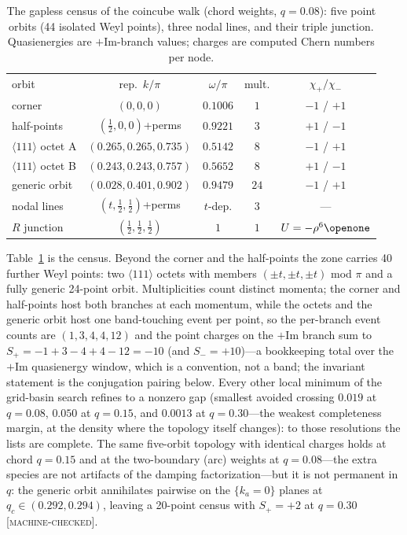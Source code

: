 \documentclass[aps,prd,twocolumn,superscriptaddress,nofootinbib,floatfix]{revtex4-2}
\newcommand{\evM}{\textnormal{\textsc{[machine-checked]}}}
\begin{document}
\begin{table}[!htb]
\caption{The gapless census of the coincube walk (chord weights,
$q=0.08$): five point orbits (44 isolated Weyl points), three nodal
lines, and their triple junction. Quasienergies are $+$Im-branch values;
charges are computed Chern numbers per node.}
\label{tab:census}
\begin{ruledtabular}
\footnotesize
\begin{tabular}{lcccc}
orbit & rep.\ $k/\pi$ & $\omega/\pi$ & mult. & $\chi_{+}/\chi_{-}$\\
\colrule
corner & $(0,0,0)$ & $0.1006$ & $1$ & $-1$ / $+1$\\
half-points & $(\tfrac12,0,0)$+perms & $0.9221$ & $3$ & $+1$ / $-1$\\
$\langle111\rangle$ octet A & $(0.265,0.265,0.735)$ & $0.5142$ & $8$ & $-1$ / $+1$\\
$\langle111\rangle$ octet B & $(0.243,0.243,0.757)$ & $0.5652$ & $8$ & $+1$ / $-1$\\
generic orbit & $(0.028,0.401,0.902)$ & $0.9479$ & $24$ & $-1$ / $+1$\\
nodal lines & $(t,\tfrac12,\tfrac12)$+perms & $t$-dep. & $3$ & ---\\
$R$ junction & $(\tfrac12,\tfrac12,\tfrac12)$ & $1$ & $1$ & $U=-\rho^6\openone$
\end{tabular}
\end{ruledtabular}
\end{table}

Table~\ref{tab:census} is the census. Beyond the corner and the
half-points the zone carries 40 further Weyl points: two
$\langle111\rangle$ octets with members $(\pm t,\pm t,\pm t)$ mod $\pi$
and a fully generic 24-point orbit. Multiplicities count distinct
momenta; the corner and half-points host both branches at each
momentum, while the octets and the generic orbit host one
band-touching event per point, so the per-branch event counts are
$(1,3,4,4,12)$ and the point charges on the $+$Im branch sum to
$S_+=-1+3-4+4-12=-10$ (and $S_-=+10$)---a bookkeeping total over the
$+$Im quasienergy window, which is a convention, not a band; the
invariant statement is the conjugation pairing below. Every other
local minimum of the grid-basin search refines to a nonzero gap
(smallest avoided crossing $0.019$ at $q=0.08$, $0.050$ at $q=0.15$,
and $0.0013$ at $q=0.30$---the weakest completeness margin, at the
density where the topology itself changes): to those resolutions the
lists are complete. The same five-orbit topology with
identical charges holds at chord $q=0.15$ and at the two-boundary
(arc) weights at $q=0.08$---the extra species are not artifacts of the
damping factorization---but it is not permanent in $q$: the generic
orbit annihilates pairwise on the $\{k_a=0\}$ planes at
$q_c\in(0.292,0.294)$, leaving a 20-point census with $S_+=+2$ at
$q=0.30$ \evM{}.
\end{document}
